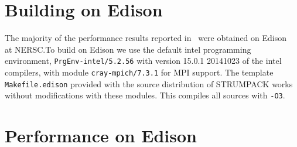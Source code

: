 \documentclass{acmsmall}
\begin{document}
\section{Building on Edison}

The majority of the performance results reported
in~\cite{rouet:strumpack} were obtained on Edison~\cite{Edison} at
NERSC.\@ To build \strumpack{} on Edison we use the default intel
programming environment, \verb!PrgEnv-intel/5.2.56!  with version
15.0.1 20141023 of the intel compilers, with module
\verb!cray-mpich/7.3.1! for MPI support.  The template
\verb!Makefile.edison! provided with the source distribution of
STRUMPACK works without modifications with these modules.  This
compiles all sources with \verb!-O3!.


\section{Performance on Edison}
\end{document}
